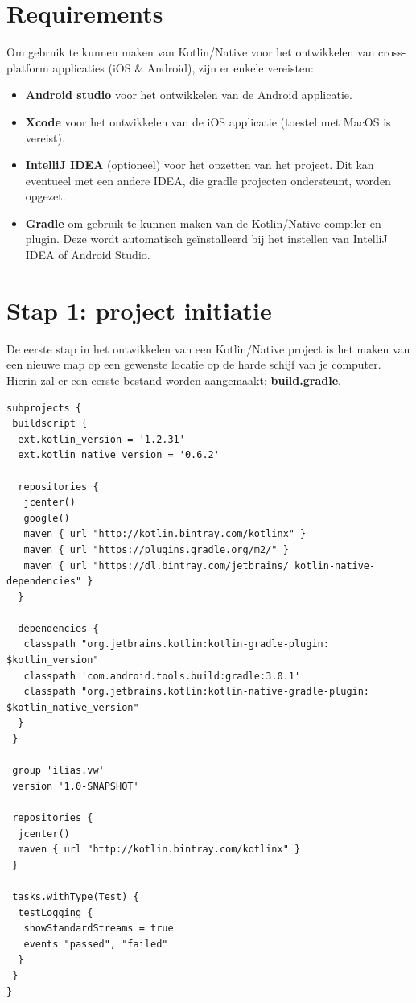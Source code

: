 \section{Requirements}
Om gebruik te kunnen maken van Kotlin/Native voor het ontwikkelen van cross-platform applicaties (iOS \& Android), zijn er enkele vereisten:
\begin{itemize}
	\item \textbf{Android studio} voor het ontwikkelen van de Android applicatie.
	\item \textbf{Xcode} voor het ontwikkelen van de iOS applicatie (toestel met MacOS is vereist).
	\item \textbf{IntelliJ IDEA} (optioneel) voor het opzetten van het project. Dit kan eventueel met een andere IDEA, die gradle projecten ondersteunt, worden opgezet.
	\item \textbf{Gradle} om gebruik te kunnen maken van de Kotlin/Native compiler en plugin. Deze wordt automatisch geïnstalleerd bij het instellen van IntelliJ IDEA of Android Studio.
\end{itemize}

\section{Stap 1: project initiatie}
De eerste stap in het ontwikkelen van een Kotlin/Native project is het maken van een nieuwe map op een gewenste locatie op de harde schijf van je computer. Hierin zal er een eerste bestand worden aangemaakt: \textbf{build.gradle}.

\begin{lstlisting}
subprojects {
 buildscript {
  ext.kotlin_version = '1.2.31'
  ext.kotlin_native_version = '0.6.2'
		
  repositories {
   jcenter()
   google()
   maven { url "http://kotlin.bintray.com/kotlinx" }
   maven { url "https://plugins.gradle.org/m2/" }
   maven { url "https://dl.bintray.com/jetbrains/ kotlin-native-dependencies" }
  }

  dependencies {
   classpath "org.jetbrains.kotlin:kotlin-gradle-plugin: $kotlin_version"
   classpath 'com.android.tools.build:gradle:3.0.1'
   classpath "org.jetbrains.kotlin:kotlin-native-gradle-plugin: $kotlin_native_version"
  }
 }
	
 group 'ilias.vw'
 version '1.0-SNAPSHOT'
	
 repositories {
  jcenter()
  maven { url "http://kotlin.bintray.com/kotlinx" }
 }
	
 tasks.withType(Test) {
  testLogging {
   showStandardStreams = true
   events "passed", "failed"
  }
 }
}
\end{lstlisting}
